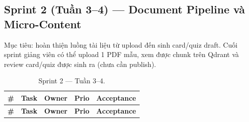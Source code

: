 \subsection{Sprint 2 (Tuần 3--4) --- Document Pipeline và Micro-Content}
\label{subsec:sprint2-gd2}

Mục tiêu: hoàn thiện luồng tài liệu từ upload đến sinh card/quiz draft.
Cuối sprint giảng viên có thể upload 1 PDF mẫu, xem được chunk trên
Qdrant và review card/quiz được sinh ra (chưa cần publish).

\begin{longtable}{|p{0.7cm}|p{6.3cm}|p{1.2cm}|p{1cm}|p{3cm}|}
    \caption{Sprint 2 --- Tuần 3--4.}
    \label{tab:sprint2-gd2} \\
    \hline
    \textbf{\#} & \textbf{Task} & \textbf{Owner} & \textbf{Prio} & \textbf{Acceptance} \\
    \hline
    \endfirsthead
    \hline
    \textbf{\#} & \textbf{Task} & \textbf{Owner} & \textbf{Prio} & \textbf{Acceptance} \\
    \hline
    \endhead


\end{longtable}
